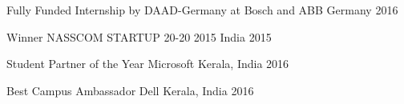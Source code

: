 



\begin{cvhonors}

  \cvhonor
    {Fully Funded Internship by DAAD-Germany} %
    {at Bosch and ABB} %
    {Germany} %
    {2016} %

\end{cvhonors}




\begin{cvhonors}


  \cvhonor
    {Winner} %
    {NASSCOM STARTUP 20-20 2015} %
    {India} %
    {2015} %


  \cvhonor
    {Student Partner of the Year} %
    {Microsoft} %
    {Kerala, India} %
    {2016} %


  \cvhonor
    {Best Campus Ambassador} %
    {Dell} %
    {Kerala, India} %
    {2016} %

\end{cvhonors}
